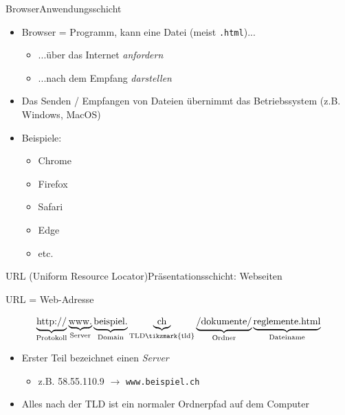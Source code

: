 \begin{frame}[fragile]{\faSafari{} Browser}{Anwendungsschicht}
\begin{itemize}
\item Browser = Programm, kann eine Datei (meist \texttt{.html})...
\begin{itemize}
\item ...über das Internet \textit{anfordern}
\item ...nach dem Empfang \textit{darstellen}
\end{itemize}
\item Das Senden / Empfangen von Dateien übernimmt das Betriebssystem (z.B. Windows, MacOS)
\item Beispiele: 
\begin{itemize}
\item \faChrome{} Chrome
\item \faFirefox{} Firefox
\item \faSafari{} Safari
\item \faEdge{} Edge
\item  etc.
\end{itemize}
\end{itemize}
\end{frame}


\begin{frame}[fragile]{\faSitemap{} URL (Uniform Resource Locator)}{Präsentationsschicht: Webseiten}

URL = Web-Adresse

\[
\underbrace{\text{http://}}_{\text{Protokoll}}
\underbrace{\text{www.}}_{\text{Server}}
\underbrace{\text{beispiel.}}_{\text{Domain}}
\underbrace{\text{ch}}_{\text{TLD\tikzmark{tld}}}
\underbrace{\text{/dokumente/}}_{\text{Ordner}}
\underbrace{\text{reglemente.html}}_{\text{Dateiname}}
\]

\begin{itemize}[<+->]
\item Erster Teil bezeichnet einen \textit{Server}
\begin{itemize}
\item z.B. 58.55.110.9 $\rightarrow$ \texttt{www.beispiel.ch}
\end{itemize}
\item Alles nach der TLD ist ein normaler Ordnerpfad auf dem Computer
\end{itemize}

\end{frame}

